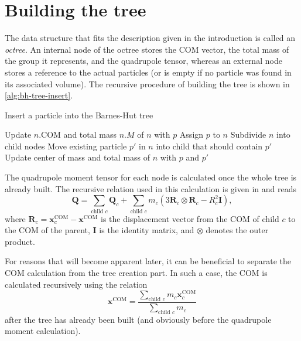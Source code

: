 \section{Building the tree}
The data structure that fits the description given in the introduction is called an \textit{octree}.
An internal node of the octree stores the COM vector, the total mass of the group it represents, and the quadrupole tensor, whereas an external node stores a reference to the actual particles (or is empty if no particle was found in its associated volume).
The recursive procedure of building the tree is shown in \autoref{alg:bh-tree-insert}.
\begin{algorithm}
    \caption{Insert a particle into the Barnes-Hut tree}\label{alg:bh-tree-insert}
    \begin{algorithmic}[1]
        \State Update $n.\textrm{COM}$ and total mass $n.M$ of $n$ with $p$
        \State {}
        \State Assign $p$ to $n$
        \Else {}
        \State Subdivide $n$ into child nodes
        \State Move existing particle $p'$ in $n$ into child that should contain $p'$
        \State Update center of mass and total mass of $n$ with $p$ and $p'$
        \State {}
        \EndIf
        \EndFunction
    \end{algorithmic}
\end{algorithm}
The quadrupole moment tensor for each node is calculated once the whole tree is already built.
The recursive relation used in this calculation is given in \cite{hernquist1987performance} and reads
\begin{equation*}
    \mathbf{Q} = \sum_{\text{child }c} \mathbf{Q}_c + \sum_{\text{child }c} m_c(3 \mathbf{R}_c \otimes \mathbf{R}_c - R_c^2 \mathbf{I}),
\end{equation*}
where $\mathbf{R}_c = \mathbf{x}^\text{COM}_c - \mathbf{x}^\text{COM}$ is the displacement vector from the COM of child $c$ to the COM of the parent, $\mathbf{I}$ is the identity matrix, and $\otimes$ denotes the outer product.

For reasons that will become apparent later, it can be beneficial to separate the COM calculation from the tree creation part.
In such a case, the COM is calculated recursively using the relation
\begin{equation}\label{eq:bh-com-calculation}
    \mathbf{x}^\text{COM} = \frac{\sum_{\text{child } c} m_c \mathbf{x}_c^\text{COM}}{\sum_{\text{child } c} m_c}
\end{equation}
after the tree has already been built (and obviously before the quadrupole moment calculation).
